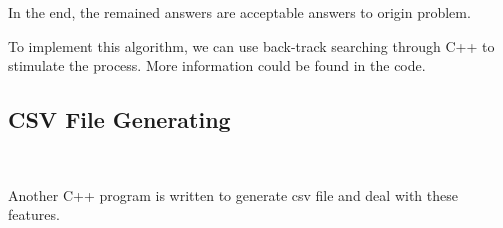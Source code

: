 In the end, the remained answers are acceptable answers to origin problem.

To implement this algorithm, we can use back-track searching through C++ to stimulate the process. More information could be found in the code.

\subsection{CSV File Generating}~\label{sec.DataGen4}

Another C++ program is written to generate csv file and deal with these features.